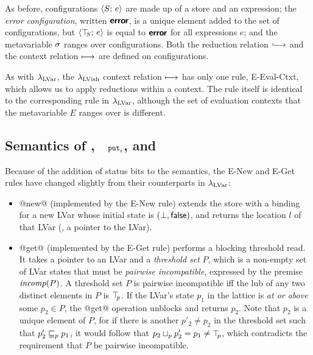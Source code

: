 As before, configurations $\langle S;\, e \rangle$ are made up of a store and
an expression; the \emph{error configuration}, written $\textbf{\textsf{error}}$, is a
unique element added to the set of configurations, but
$\langle \top\hspace{-0.85mm}_{S};\, e \rangle$ is equal to $\textbf{\textsf{error}}$ for all expressions $e$; and
the metavariable $\sigma$ ranges over configurations.  Both the
reduction relation $\parstepsto$ and the context relation
$\longmapsto$ are defined on configurations.

As with $\lambda_{\textrm{LVar}}$, the $\lambda_{\textrm{LVish}}$ context relation
$\longmapsto$ has only one rule, {\sc E-Eval-Ctxt}, which allows us to
apply reductions within a context. The rule itself is identical to the
corresponding rule in $\lambda_{\textrm{LVar}}$, although the set of evaluation
contexts that the metavariable $E$ ranges over is different.

\subsection{Semantics of , $\PUTi$, and }\label{subsection:quasi-semantics-of-new-put-and-get}

Because of the addition of status bits to the semantics, the {\sc
  E-New} and {\sc E-Get} rules have changed slightly from their
counterparts in $\lambda_{\textrm{LVar}}$:

\begin{itemize}
\item @new@ (implemented by the {\sc E-New} rule) extends the store
  with a binding for a new LVar whose initial state is $(\bot,
  \textsf{false})$, and returns the location $l$ of that LVar (\ie, a
  pointer to the LVar).
\item @get@ (implemented by the {\sc E-Get} rule) performs a blocking
  threshold read.  It takes a pointer to an LVar and a \emph{threshold
    set} $P$, which is a non-empty set of LVar states that must be
  \emph{pairwise incompatible}, expressed by the premise $\mathit{incomp}(P)$.
  A threshold set $P$ is pairwise incompatible iff the lub of any two
  distinct elements in $P$ is $\top\hspace{-0.85mm}_{p}$.  If the LVar's state $p_1$ in
  the lattice is \emph{at or above} some $p_2 \in P$, the @get@
  operation unblocks and returns $p_2$.  Note that $p_2$ is a unique
  element of $P$, for if there is another $p'_2 \neq p_2$ in the
  threshold set such that $p'_2 \sqsubseteq_p p_1$, it would follow that
  $p_2 \sqcup_p p'_2 = p_1 \neq \top\hspace{-0.85mm}_{p}$, which contradicts the
  requirement that $P$ be pairwise incompatible.
\end{itemize}

